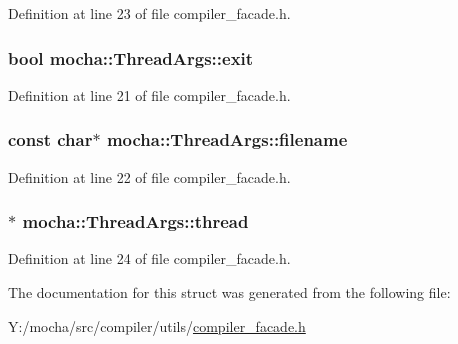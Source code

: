 Definition at line 23 of file compiler\_\-facade.h.

\hypertarget{structmocha_1_1_thread_args_aa0ce52a87d3abe5d7a94d6ab1b050813}{
\subsubsection[{exit}]{\setlength{\rightskip}{0pt plus 5cm}bool {\bf mocha::ThreadArgs::exit}}}
\label{structmocha_1_1_thread_args_aa0ce52a87d3abe5d7a94d6ab1b050813}


Definition at line 21 of file compiler\_\-facade.h.

\hypertarget{structmocha_1_1_thread_args_a49947d08afea2ba71b4aa06397125a30}{
\subsubsection[{filename}]{\setlength{\rightskip}{0pt plus 5cm}const char$\ast$ {\bf mocha::ThreadArgs::filename}}}
\label{structmocha_1_1_thread_args_a49947d08afea2ba71b4aa06397125a30}


Definition at line 22 of file compiler\_\-facade.h.

\hypertarget{structmocha_1_1_thread_args_a7d95fa5b63ed190b2f1c3acd6a77aaec}{
\subsubsection[{thread}]{$\ast$ {\bf mocha::ThreadArgs::thread}}}
\label{structmocha_1_1_thread_args_a7d95fa5b63ed190b2f1c3acd6a77aaec}


Definition at line 24 of file compiler\_\-facade.h.



The documentation for this struct was generated from the following file:\begin{DoxyCompactItemize}
\item 
Y:/mocha/src/compiler/utils/\hyperlink{compiler__facade_8h}{compiler\_\-facade.h}\end{DoxyCompactItemize}
